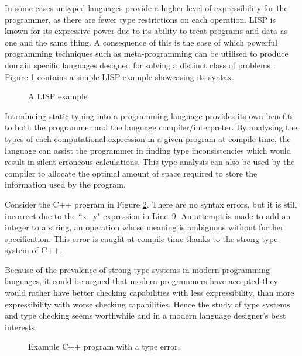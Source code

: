 \documentclass{UoYCSproject}
\begin{document}
In some cases untyped languages provide a higher level of expressibility for
the programmer, as there are fewer type restrictions on each operation.
LISP is known for its expressive power due to its ability to treat programs and
data as one and the same thing. A consequence of this is the ease of which
powerful programming techniques such as meta-programming can be utilised to
produce domain specific languages designed for solving a distinct class of
problems \cite[p.~5]{SICP}. Figure \ref{fig:SimpleTypedLanguages} contains a
simple LISP example showcasing its syntax.

\begin{figure}
    
    \caption{A LISP example}
    \label{fig:SimpleTypedLanguages}
\end{figure}

Introducing static typing into a programming language provides its own benefits
to both the programmer and the language compiler/interpreter. By analysing the
types of each computational expression in a given program at compile-time,
the language can assist the programmer in finding type
inconsistencies which would result in silent erroneous calculations. This type
analysis can also be used by the compiler to allocate the optimal amount of
space required to store the information used by the program.

Consider the C++ program in Figure \ref{fig:C++TypeError}.
There are no syntax errors, but it is still incorrect due to the
``x+y" expression in Line~9. An attempt is made to add an integer to a string,
an operation whose meaning is ambiguous without further specification. This
error is caught at compile-time thanks to the strong type system of C++.

Because of the prevalence of strong type systems in modern programming
languages, it could be argued that modern programmers have accepted they would
rather have better checking capabilities with less expressibility, than more
expressibility with worse checking capabilities. Hence the study of type systems
and type checking seems worthwhile and in a modern language designer's best
interests.

\begin{figure}


\caption{Example C++ program with a type error.}
\label{fig:C++TypeError}
\end{figure}
\end{document}
